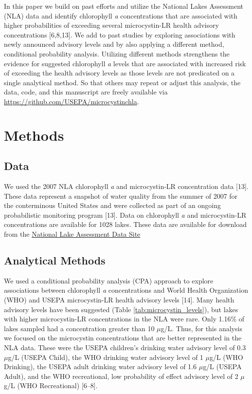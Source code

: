 \documentclass[10pt,a4paper,twocolumn]{article}
\begin{document}
In this paper we build on past efforts and utilize the National Lakes
Assessment (NLA) data and identify chlorophyll \emph{a} concentrations
that are associated with higher probabilities of exceeding several
microcystin-LR health advisory concentrations {[}6,8,13{]}. We add to
past studies by exploring associations with newly announced advisory
levels and by also applying a different method, conditional probability
analysis. Utilizing different methods strengthens the evidence for
suggested chlorophyll \emph{a} levels that are associated with increased
risk of exceeding the health advisory levels as those levels are not
predicated on a single analytical method. So that others may repeat or
adjust this analysis, the data, code, and this manuscript are freely
available via
\href{https://github.com/USAPE/microcystinchla}{\url{https://github.com/USEPA/microcystinchla}}.

\section{Methods}\label{methods}

\subsection{Data}\label{data}

We used the 2007 NLA chlorophyll \emph{a} and microcystin-LR
concentration data {[}13{]}. These data represent a snapshot of water
quality from the summer of 2007 for the conterminous United States and
were collected as part of an ongoing probabilistic monitoring program
{[}13{]}. Data on chlorophyll \emph{a} and microcystin-LR concentrations
are available for 1028 lakes. These data are available for download from
the
\href{http://www.epa.gov/national-aquatic-resource-surveys/data-national-aquatic-resource-surveys}{National
Lake Assessment Data Site}

\subsection{Analytical Methods}\label{analytical-methods}

We used a conditional probability analysis (CPA) approach to explore
associations between chlorophyll \emph{a} concentrations and World
Health Organization (WHO) and USEPA microcystin-LR health advisory
levels {[}14{]}. Many health advisory levels have been suggested (Table
\ref{tab:microcystin_levels}), but lakes with higher microcystin-LR
concentrations in the NLA were rare. Only 1.16\% of lakes sampled had a
concentration greater than 10 \(\mu\)g/L. Thus, for this analysis we
focused on the microcystin concentrations that are better represented in
the NLA data. These were the USEPA children's drinking water advisory
level of 0.3 \(\mu\)g/L (USEPA Child), the WHO drinking water advisory
level of 1 \(\mu\)g/L (WHO Drinking), the USEPA adult drinking water
advisory level of 1.6 \(\mu\)g/L (USEPA Adult), and the WHO
recreational, low probability of effect advisory level of 2 \(\mu\)g/L
(WHO Recreational) {[}6--8{]}.
\end{document}
